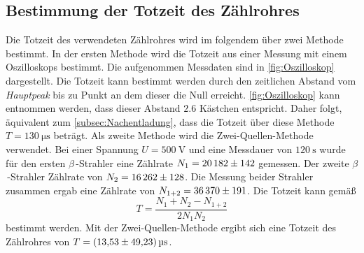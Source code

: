 \subsection{Bestimmung der Totzeit des Zählrohres}
\label{subsec:A_Totzeit}
Die Totzeit des verwendeten Zählrohres wird im folgendem über zwei Methode bestimmt. 
In der ersten Methode wird die Totzeit aus einer Messung mit einem Oszilloskops bestimmt. Die aufgenommen Messdaten sind in \autoref{fig:Oszilloskop} dargestellt.
Die Totzeit kann bestimmt werden durch den zeitlichen Abstand vom \textit{Hauptpeak} bis zu Punkt an dem dieser die Null erreicht. \autoref{fig:Oszilloskop} kann entnommen 
werden, dass dieser Abstand $\num{2.6}$ Kästchen entspricht. Daher folgt, äquivalent zum \autoref{subsec:Nachentladung}, dass die Totzeit über diese Methode 
$T = \qty{130}{\micro\second}$ beträgt.
Als zweite Methode wird die Zwei-Quellen-Methode verwendet. Bei einer Spannung $U = \qty{500}{\volt}$ und eine Messdauer von $\qty{120}{\second}$ wurde für den ersten 
$\beta$\,-Strahler eine Zählrate $N_1 = \num{20182 +- 142}$ gemessen. Der zweite $\beta$\,-Strahler Zählrate von $N_2 = \num{16262 +- 128}$. Die Messung beider 
Strahler zusammen ergab eine Zählrate von $N_{1+2} = \num{36370 +- 191}$. 
Die Totzeit kann gemäß 
\begin{equation}
  \label{eqn:Totzeit}
  T = \frac{N_1 + N_2 - N_{1+2}}{2N_1N_2}
\end{equation}
bestimmt werden. Mit der Zwei-Quellen-Methode ergibt sich eine Totzeit des Zählrohres von $T = \qty{13.53+-49.23}{\micro\second}$.

